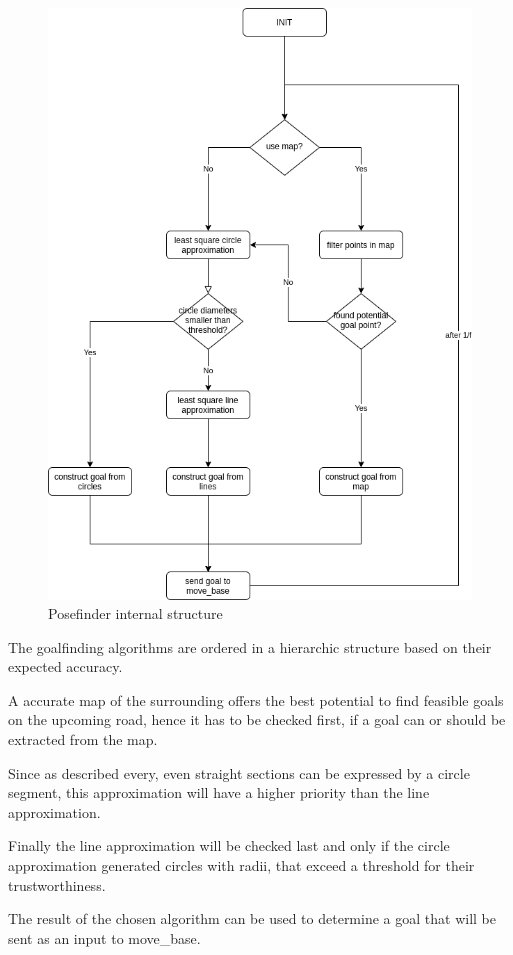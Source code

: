\begin{figure}[H]
	\centering
	\includegraphics[width=.9\textwidth]{Pictures/posefinder diagram}
	\caption{Posefinder internal structure}
	\label{posefinder structure}
\end{figure}

The goalfinding algorithms are ordered in a hierarchic structure based on their expected accuracy.

A accurate map of the surrounding offers the best potential to find feasible goals on the upcoming road, hence it has to be checked first, if a goal can or should be extracted from the map.

Since as described every, even straight sections can be expressed by a circle segment, this approximation will have a higher priority than the line approximation.

Finally the line approximation will be checked last and only if the circle approximation generated circles with radii, that exceed a threshold for their trustworthiness.

The result of the chosen algorithm can be used to determine a goal that will be sent as an input to move\_base.

